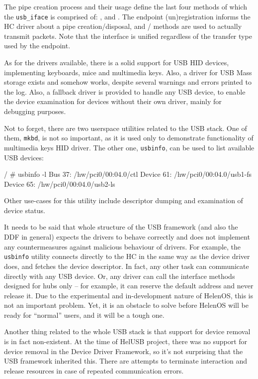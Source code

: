 The pipe creation process and their usage define the last four methods of which
the \texttt{usb\_iface} is comprised of: , 
and . The endpoint (un)registration informs the HC driver about
a pipe creation/disposal, and / methods are used to
actually transmit packets. Note that the interface is unified regardless of the
transfer type used by the endpoint.

As for the drivers available, there is a solid support for USB HID devices,
implementing keyboards, mice and multimedia keys. Also, a driver for USB Mass
storage exists and somehow works, despite several warnings and errors printed
to the log. Also, a fallback driver is provided to handle any USB device, to
enable the device examination for devices without their own driver, mainly for
debugging purposes.

Not to forget, there are two userspace utilities related to the USB stack. One
of them, \texttt{mkbd}, is not so important, as it is used only to demonstrate
functionality of multimedia keys HID driver. The other one, \texttt{usbinfo},
can be used to list available USB devices:

\begin{bdsh}
/ # usbinfo -l
Bus 37: /hw/pci0/00:04.0/ctl
	Device 61: /hw/pci0/00:04.0/usb1-fs
	Device 65: /hw/pci0/00:04.0/usb2-ls
\end{bdsh}

Other use-cases for this utility include descriptor dumping and examination of
device status.

It needs to be said that whole structure of the USB framework (and also the
DDF in general) expects the drivers to behave correctly and does not
implement any countermeasures against malicious behaviour of drivers. For
example, the \texttt{usbinfo} utility connects directly to the HC in the same
way as the device driver does, and fetches the device descriptor. In fact, any
other task can communicate directly with any USB device. Or, any driver can
call the interface methods designed for hubs only -- for example, it can
reserve the default address and never release it. Due to the experimental and
in-development nature of HelenOS, this is not an important problem. Yet, it is
an obstacle to solve before HelenOS will be ready for ``normal'' users, and it
will be a tough one.

Another thing related to the whole USB stack is that support for device
removal is in fact non-existent. At the time of HelUSB project, there was no
support for device removal in the Device Driver Framework, so it's not
surprising that the USB framework inherited this. There are attempts to
terminate interaction and release resources in case of repeated communication
errors.
